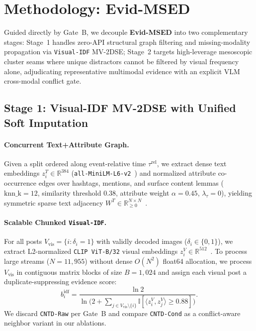 \section{Methodology: Evid-MSED}
\label{sec:method}

Guided directly by Gate~B, we decouple \textbf{Evid-MSED} into two complementary stages: Stage~1 handles zero-API structural graph filtering and missing-modality propagation via \texttt{Visual-IDF} MV-2DSE; Stage~2 targets high-leverage mesoscopic cluster seams where unique distractors cannot be filtered by visual frequency alone, adjudicating representative multimodal evidence with an explicit VLM cross-modal conflict gate.

\subsection{Stage 1: Visual-IDF MV-2DSE with Unified Soft Imputation}
\label{sec:stage1_method}

\paragraph{Concurrent Text+Attribute Graph.}
Given a split ordered along event-relative time $\tau^{\text{rel}}$, we extract dense text embeddings $z_i^T \in \mathbb{R}^{384}$ (\texttt{all-MiniLM-L6-v2}~\cite{reimers2019sentence}) and normalized attribute co-occurrence edges over hashtags, mentions, and surface content lemmas ($\text{knn\_k}=12$, similarity threshold $0.38$, attribute weight $\alpha=0.45$, $\lambda_\tau = 0$), yielding symmetric sparse text adjacency $W^T \in \mathbb{R}_{\ge 0}^{N \times N}$~\cite{cao2024hisevent}.

\paragraph{Scalable Chunked \texttt{Visual-IDF}.}
For all posts $V_{\text{vis}} = \{i : \delta_i = 1\}$ with validly decoded images ($\delta_i \in \{0,1\}$), we extract L2-normalized \texttt{CLIP ViT-B/32} visual embeddings $z_i^V \in \mathbb{R}^{512}$~\cite{radford2021clip}. To process large streams ($N=11{,}955$) without dense $O(N^2)$ float64 allocation, we process $V_{\text{vis}}$ in contiguous matrix blocks of size $B = 1{,}024$ and assign each visual post a duplicate-suppressing evidence score:
\begin{equation}
\label{eq:visual_idf}
b_i^{\text{idf}} = \frac{\ln 2}{\ln\!\big(2 + \sum_{j \in V_{\text{vis}} \setminus \{i\}} \mathbb{I}[\langle z_i^V, z_j^V \rangle \ge 0.88]\big)}.
\end{equation}
We discard \texttt{CNTD-Raw} per Gate~B and compare \texttt{CNTD-Cond} as a conflict-aware neighbor variant in our ablations.

